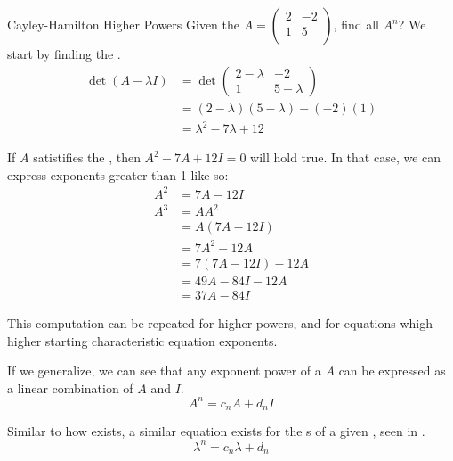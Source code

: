 \begin{example}{Cayley-Hamilton Higher Powers}
  Given the  $A =
  \begin{pmatrix}
    2 & -2 \\
    1 & 5 \\
  \end{pmatrix}$, find all $A^{n}$?
  We start by finding the .
  \begin{align*}
    \det (A - \lambda I) &= \det
                           \begin{pmatrix}
                             2-\lambda & -2 \\
                             1 & 5 - \lambda
                           \end{pmatrix} \\
                         &= (2-\lambda)(5 - \lambda) - (-2)(1) \\
                         &= \lambda^{2}- 7\lambda + 12
  \end{align*}

  If $A$ satistifies the , then $A^{2} - 7A + 12I = 0$ will hold true.
  In that case, we can express exponents greater than 1 like so:
  \begin{align*}
    A^{2} &= 7A - 12I \\
    A^{3} &= A A^{2} \\
          &= A (7A - 12I) \\
          &= 7A^{2} - 12A \\
          &= 7(7A-12I) - 12A \\
          &= 49A - 84I - 12A \\
          &= 37A - 84I
  \end{align*}

  This computation can be repeated for higher powers, and for equations whigh higher starting characteristic equation exponents.
\end{example}

If we generalize, we can see that any exponent power of a  $A$ can be expressed as a linear combination of $A$ and $I$.
\begin{equation}\label{eq:Matrix_Constant_Time_Higher_Power}
  A^{n} = c_{n} A + d_{n} I
\end{equation}

Similar to how  exists, a similar equation exists for the s of a given , seen in .
\begin{equation}\label{eq:Eigenvalue_Constant_Time_Higher_Power}
  \lambda^{n} = c_{n} \lambda + d_{n}
\end{equation}

